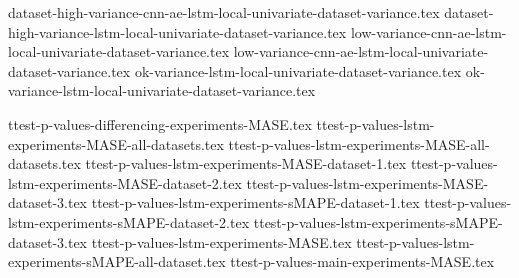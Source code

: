 {dataset-high-variance-cnn-ae-lstm-local-univariate-dataset-variance.tex}
{dataset-high-variance-lstm-local-univariate-dataset-variance.tex}
{low-variance-cnn-ae-lstm-local-univariate-dataset-variance.tex}
{low-variance-cnn-ae-lstm-local-univariate-dataset-variance.tex}
{ok-variance-lstm-local-univariate-dataset-variance.tex}
{ok-variance-lstm-local-univariate-dataset-variance.tex}

{ttest-p-values-differencing-experiments-MASE.tex}
{ttest-p-values-lstm-experiments-MASE-all-datasets.tex}
{ttest-p-values-lstm-experiments-MASE-all-datasets.tex}
{ttest-p-values-lstm-experiments-MASE-dataset-1.tex}
{ttest-p-values-lstm-experiments-MASE-dataset-2.tex}
{ttest-p-values-lstm-experiments-MASE-dataset-3.tex}
{ttest-p-values-lstm-experiments-sMAPE-dataset-1.tex}
{ttest-p-values-lstm-experiments-sMAPE-dataset-2.tex}
{ttest-p-values-lstm-experiments-sMAPE-dataset-3.tex}
{ttest-p-values-lstm-experiments-MASE.tex}
{ttest-p-values-lstm-experiments-sMAPE-all-dataset.tex}
{ttest-p-values-main-experiments-MASE.tex}
